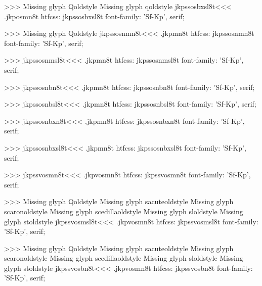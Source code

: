 >>>
Missing glyph	Qoldstyle
Missing glyph	qoldstyle
\<jkpssosbxsl8t\><<<
.jkposmn8t
htfcss:  jkpssosbxsl8t  font-family: 'Sf-Kp', serif;

>>>
Missing glyph	Qoldstyle
\<jkpssosnmn8t\><<<
.jkpmn8t
htfcss:  jkpssosnmn8t  font-family: 'Sf-Kp', serif;

>>>
\<jkpssosnmsl8t\><<<
.jkpmn8t
htfcss:  jkpssosnmsl8t  font-family: 'Sf-Kp', serif;

>>>
\<jkpssosnbn8t\><<<
.jkpmn8t
htfcss:  jkpssosnbn8t  font-family: 'Sf-Kp', serif;

>>>
\<jkpssosnbsl8t\><<<
.jkpmn8t
htfcss:  jkpssosnbsl8t  font-family: 'Sf-Kp', serif;

>>>
\<jkpssosnbxn8t\><<<
.jkpmn8t
htfcss:  jkpssosnbxn8t  font-family: 'Sf-Kp', serif;

>>>
\<jkpssosnbxsl8t\><<<
.jkpmn8t
htfcss:  jkpssosnbxsl8t  font-family: 'Sf-Kp', serif;

>>>
\<jkpssvosmn8t\><<<
.jkpvosmn8t
htfcss:  jkpssvosmn8t  font-family: 'Sf-Kp', serif;

>>>
Missing glyph	Qoldstyle
Missing glyph	sacuteoldstyle
Missing glyph	scaronoldstyle
Missing glyph	scedillaoldstyle
Missing glyph	sloldstyle
Missing glyph	stoldstyle
\<jkpssvosmsl8t\><<<
.jkpvosmn8t
htfcss:  jkpssvosmsl8t  font-family: 'Sf-Kp', serif;

>>>
Missing glyph	Qoldstyle
Missing glyph	sacuteoldstyle
Missing glyph	scaronoldstyle
Missing glyph	scedillaoldstyle
Missing glyph	sloldstyle
Missing glyph	stoldstyle
\<jkpssvosbn8t\><<<
.jkpvosmn8t
htfcss:  jkpssvosbn8t  font-family: 'Sf-Kp', serif;

